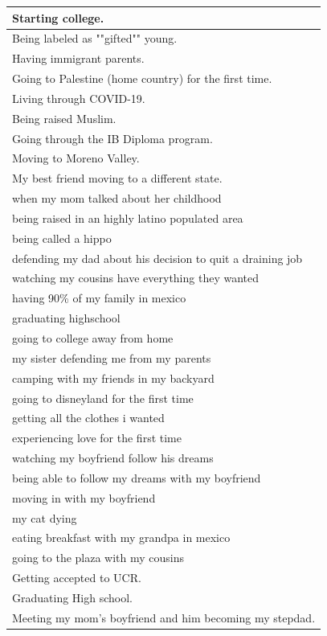 \documentclass[
  .7em,
  letterpaper,
  DIV=11,
  numbers=noendperiod]{scrartcl}
\begin{document}
\begin{table}
\begin{tabular}{l}
\hline
Starting college.\\
\hline
Being labeled as ""gifted"" young.\\
\hline
Having immigrant parents.\\
\hline
Going to Palestine (home country) for the first time.\\
\hline
Living through COVID-19.\\
\hline
Being raised Muslim.\\
\hline
Going through the IB Diploma program.\\
\hline
Moving to Moreno Valley.\\
\hline
My best friend moving to a different state.\\
\hline
when my mom talked about her childhood\\
\hline
being raised in an highly latino populated area\\
\hline
being called a hippo\\
\hline
defending my dad about his decision to quit a draining job\\
\hline
watching my cousins have everything they wanted\\
\hline
having 90\% of my family in mexico\\
\hline
graduating highschool\\
\hline
going to college away from home\\
\hline
my sister defending me from my parents\\
\hline
camping with my friends in my backyard\\
\hline
going to disneyland for the first time\\
\hline
getting all the clothes i wanted\\
\hline
experiencing love for the first time\\
\hline
watching my boyfriend follow his dreams\\
\hline
being able to follow my dreams with my boyfriend\\
\hline
moving in with my boyfriend\\
\hline
my cat dying\\
\hline
eating breakfast with my grandpa in mexico\\
\hline
going to the plaza with my cousins\\
\hline
Getting accepted to UCR.\\
\hline
Graduating High school.\\
\hline
Meeting my mom's boyfriend and him becoming my stepdad.\\

\end{tabular}
\end{table}
\end{document}
